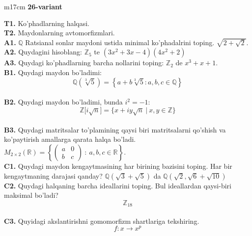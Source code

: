 \documentclass{article}
\begin{document}
\begin{tabular}{m{17cm}}
\textbf{26-variant}
\newline

\textbf{T1.} Ko'phadlarning halqasi. \\
\textbf{T2.} Maydonlarning avtomorfizmlari. \\
\textbf{A1.} \(\mathbb{Q}\) Ratsianal sonlar maydoni ustida minimal ko'phadalrini toping.
\(\sqrt{2 + \sqrt{2}}\). \\
\textbf{A2.} Quydagini hisoblang:
\(\mathbb{Z}_{5}\) te \(\left( 3x^{2} + 3x - 4 \right)\left( 4x^{2} + 2 \right)\) \\
\textbf{A3.} Quydagi ko'phadlarning barcha nollarini toping:
\(\mathbb{Z}_{2}\) de \(x^{3} + x + 1\). \\
\textbf{B1.} Quydagi maydon bo'ladimi:
\[\mathbb{Q}\left( \sqrt[3]{5} \right) = \left\{ a + b\sqrt[3]{5}:a,b,c \in \mathbb{Q} \right\}\] \\
\textbf{B2.} Quydagi maydon bo'ladimi, bunda \(i^{2} = - 1\):
\[\mathbb{Z\lbrack}i\sqrt{n}\rbrack = \{ x + iy\sqrt{n}\ |\ x,y \in \mathbb{Z\}}\] \\
\textbf{B3.} Quydagi matritsalar to'plamining qaysi biri matritsalarni qo'shish va ko'paytirish amallarga qarata halqa bo'ladi.
\(M_{2 \times 2}\mathbb{(R) =}\left\{ \begin{pmatrix}
a & 0 \\
b & c
\end{pmatrix}\ :\ a,b,c \in \mathbb{R} \right\}\). \\
\textbf{C1.} Quydagi maydon kengaytmasining har birining bazisini toping. Har bir kengaytmaning darajasi qanday?
\(\mathbb{Q}\left( \sqrt{3} + \sqrt{5} \right)\) da \(\mathbb{Q}\left( \sqrt{2},\sqrt{6} + \sqrt{10} \right)\) \\
\textbf{C2.} Quydagi halqaning barcha ideallarini toping. Bul ideallardan qaysi-biri maksimal bo'ladi?
\[\mathbb{Z}_{18}\] \\
\textbf{C3.} Quyidagi akslantirishni gomomorfizm shartlariga tekshiring.
\[f:x \rightarrow x^{p}\] \\

\end{tabular}
\vspace{1cm}
\end{document}
